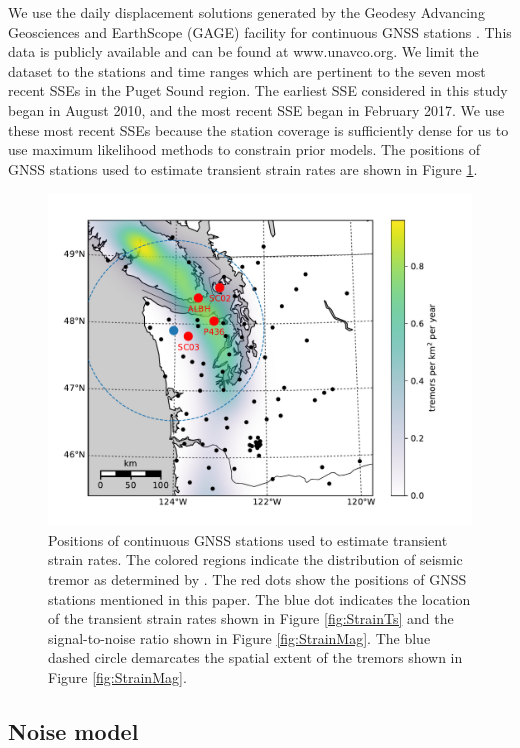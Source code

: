 \documentclass[extra,mreferee]{gji}
\begin{document}
We use the daily displacement solutions generated by the Geodesy
Advancing Geosciences and EarthScope (GAGE) facility for continuous
GNSS stations \citep{Herring2016}. This data is publicly available and
can be found at www.unavco.org. We limit the dataset to the stations
and time ranges which are pertinent to the seven most recent SSEs in
the Puget Sound region. The earliest SSE considered in this study
began in August 2010, and the most recent SSE began in February 2017.
We use these most recent SSEs because the station coverage is
sufficiently dense for us to use maximum likelihood methods to
constrain prior models.  The positions of GNSS stations used to
estimate transient strain rates are shown in Figure \ref{fig:Context}.

\begin{figure}
\includegraphics{figures/context_map/context-map.pdf}
\caption{
Positions of continuous GNSS stations used to estimate transient
strain rates. The colored regions indicate the distribution of seismic
tremor as determined by \citet{Wech2010}. The red dots show the
positions of GNSS stations mentioned in this paper. The blue dot
indicates the location of the transient strain rates shown in Figure
\ref{fig:StrainTs} and the signal-to-noise ratio shown in Figure
\ref{fig:StrainMag}. The blue dashed circle demarcates the spatial
extent of the tremors shown in Figure \ref{fig:StrainMag}.
}    
\label{fig:Context}
\end{figure}

\subsection{Noise model}\label{sec:NoiseModel}
\end{document}
